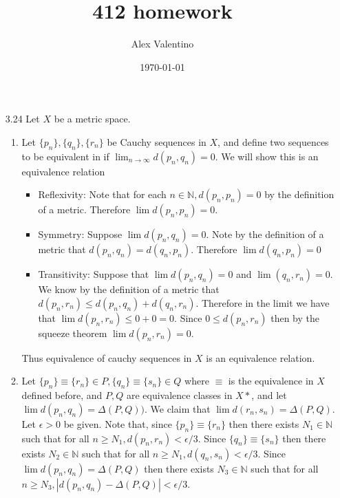 \documentclass[12pt, letterpaper]{article}
\date{\today}
\author{Alex Valentino}
\title{412 homework}
\newcommand{\N}{\mathbb{N}}
\begin{document}
\begin{enumerate}
	\iffalse \item[3.24] Let $X$ be a metric space.
	\begin{enumerate}
		\item Let $\{p_n\}, \{q_n\}, \{r_n\}$ be Cauchy sequences in $X$, and 
		define two sequences to be equivalent in if 
		$\lim_{n \to \infty}d(p_n,q_n) = 0$.  We will show this is an equivalence
		relation
		\begin{itemize}
			\item Reflexivity:  Note that for each $n \in \N, d(p_n,p_n) = 0$ by 
			the definition of a metric.  Therefore $\lim d(p_n,p_n) = 0$.
			\item Symmetry:  Suppose $\lim d(p_n,q_n) = 0$.  
			Note by the definition of a metric that $d(p_n,q_n) = d(q_n,p_n)$.  
			Therefore $\lim d(q_n,p_n) = 0$
			\item Transitivity:  Suppose that $\lim d(p_n,q_n) = 0$ and 
			$\lim(q_n,r_n) = 0$.  We know by the definition of a metric that 
			$d(p_n,r_n) \leq d(p_n,q_n) + d(q_n,r_n)$.  Therefore in the limit 
			we have that $\lim d(p_n,r_n) \leq 0 + 0 = 0$.  
			Since $0 \leq d(p_n,r_n)$ then by the squeeze theorem 
			$\lim d(p_n,r_n) = 0$.
		\end{itemize}
		Thus equivalence of cauchy sequences in $X$ is an equivalence relation.
		\item Let $\{p_n\} \equiv \{r_n\} \in P, \{q_n\} \equiv \{s_n\} \in Q$ where $\equiv$
		is the equivalence in $X$ defined before, and $P,Q$ are equivalence classes in $X*$, and let 
		$\lim d(p_n,q_n) = \Delta(P,Q))$.  
		We claim that $\lim d(r_n,s_n) = \Delta(P,Q)$.  Let $\epsilon > 0$
		be given.  Note that, since 
		$\{p_n\} \equiv \{r_n\}$ then there exists $N_1 \in \N$ such that for 
		all $n \geq N_1, d(p_n,r_n) < \epsilon/3$.  Since $\{q_n\} \equiv \{s_n\}$
		then there exists $N_2 \in \N$ such that for 
		all $n \geq N_1, d(q_n,s_n) < \epsilon/3$.  Since $\lim d(p_n,q_n) = \Delta(P,Q)$ then there exists $N_3 \in \N$ 
		such that for 
		all $n \geq N_3, |d(p_n,q_n) - \Delta(P,Q)| < \epsilon/3$.  
		

\end{enumerate}
\end{enumerate}
\end{document}
